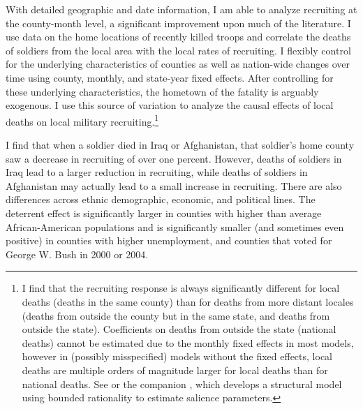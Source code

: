 \documentclass[12pt] {article}
\begin{document}
With detailed geographic and date information, I am able to analyze recruiting at the county-month level, a significant improvement upon much of the literature. I use data on the home locations of recently killed troops and correlate the deaths of soldiers from the local area with the local rates of recruiting. I flexibly control for the underlying characteristics of counties as well as nation-wide changes over time using county, monthly, and state-year fixed effects. After controlling for these underlying characteristics, the hometown of the fatality is arguably exogenous. I use this source of variation to analyze the causal effects of local deaths on local military recruiting.\footnote{I find that the recruiting response is always significantly different
for local deaths (deaths in the same county) than for deaths from
more distant locales (deaths from outside the county but in the same
state, and deaths from outside the state). Coefficients on deaths from outside the state (national deaths) cannot be estimated due to the monthly fixed effects in most models, however in (possibly misspecified) models without the fixed effects, local deaths
are multiple orders of magnitude larger for local deaths than
for national deaths. See \cite{ChettySalience} or the companion \cite{ChettyEarly},
which develops a structural model using bounded rationality to estimate salience parameters.%
} 

I find that when a soldier died in Iraq or Afghanistan, that soldier's
home county saw a decrease in recruiting of over one percent. %
However, deaths of soldiers in Iraq lead to a larger reduction in recruiting, while deaths of soldiers in Afghanistan may actually lead to a small increase in recruiting. There are also differences across ethnic demographic, economic, and political lines. The deterrent effect is significantly larger in counties with higher than average African-American populations and is significantly smaller (and sometimes even positive) in counties with higher unemployment, and counties that voted for George W. Bush in 2000 or 2004. 

\end{document}
